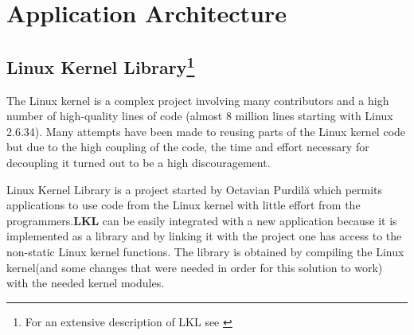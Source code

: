 \chapter{Application Architecture}
\label{chapter:arch}

\section[Linux Kernel Library]{Linux Kernel Library\footnote{For an extensive description of LKL see \cite{thesis}}}
\label{sec:lkl}
The Linux kernel is a complex project involving many contributors and a high number of high-quality lines of code (almost 8 million lines starting with Linux 2.6.34). Many attempts have been made to reusing parts of the Linux kernel code but due to the high coupling of the code, the time and effort necessary for decoupling it turned out to be a high discouragement. 

Linux Kernel Library is a project started by Octavian Purdil\u{a} which permits applications to use code from the Linux kernel with little effort from the programmers.\textbf{LKL} can be easily integrated with a new application because it is implemented as a library and by linking it with the project one has access to the non-static Linux kernel functions. The library is obtained by compiling the Linux kernel(and some changes that were needed in order for this solution to work) with the needed kernel modules. 


